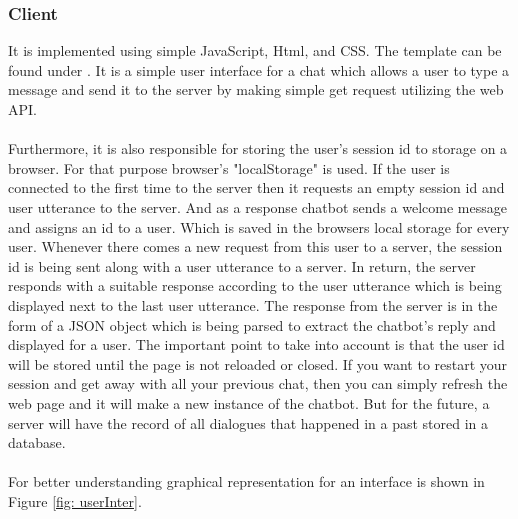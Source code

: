 \subsubsection*{Client}
It is implemented using simple JavaScript, Html, and CSS. The template can be found under \cite{userinterface}. It is a simple user interface for a chat which allows a user to type a message and send it to the server by making simple get request utilizing the web API. 
\\~\\
Furthermore, it is also responsible for storing the user's session id to storage on a browser. For that purpose browser's "localStorage" \cite{localstorage} is used. If the user is connected to the first time to the server then it requests an empty session id and user utterance to the server. And as a response chatbot sends a welcome message and assigns an id to a user. Which is saved in the browsers local storage for every user. Whenever there comes a new request from this user to a server, the session id is being sent along with a user utterance to a server. In return, the server responds with a suitable response according to the user utterance which is being displayed next to the last user utterance. The response from the server is in the form of a JSON object which is being parsed to extract the chatbot's reply and displayed for a user. The important point to take into account is that the user id will be stored until the page is not reloaded or closed. If you want to restart your session and get away with all your previous chat, then you can simply refresh the web page and it will make a new instance of the chatbot. But for the future, a server will have the record of all dialogues that happened in a past stored in a database. 
\\~\\
For better understanding graphical representation for an interface is shown in Figure \ref{fig: userInter}.

